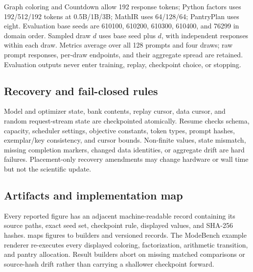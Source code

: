 Graph coloring and Countdown allow 192 response tokens; Python factors uses
192/512/192 tokens at 0.5B/1B/3B; MathIR uses 64/128/64; PantryPlan uses eight.
Evaluation base seeds are 610100, 610200, 610300, 610400, and 76299 in domain
order. Sampled draw $d$ uses base seed plus $d$, with independent responses
within each draw. Metrics average over all 128 prompts and four draws; raw
prompt responses, per-draw endpoints, and their aggregate spread are retained.
Evaluation outputs never enter training, replay, checkpoint choice, or stopping.

\subsection{Recovery and fail-closed rules}
\label{app:repro-recovery}

Model and optimizer state, bank contents, replay cursor, data cursor, and random
request-stream state are checkpointed atomically. Resume checks schema,
capacity, scheduler settings, objective constants, token types, prompt hashes,
exemplar/key consistency, and cursor bounds. Non-finite values, state mismatch,
missing completion markers, changed data identities, or aggregate drift are
hard failures. Placement-only recovery amendments may change hardware or wall
time but not the scientific update.

\subsection{Artifacts and implementation map}
\label{app:repro-artifacts}
\label{app:repro-code}

Every reported figure has an adjacent machine-readable record containing its
source paths, exact seed set, checkpoint rule, displayed values, and SHA-256
hashes.  maps figures to builders and versioned
records. The ModeBench example renderer re-executes every displayed coloring,
factorization, arithmetic transition, and pantry allocation. Result builders
abort on missing matched comparisons or source-hash drift rather than carrying a
shallower checkpoint forward.

